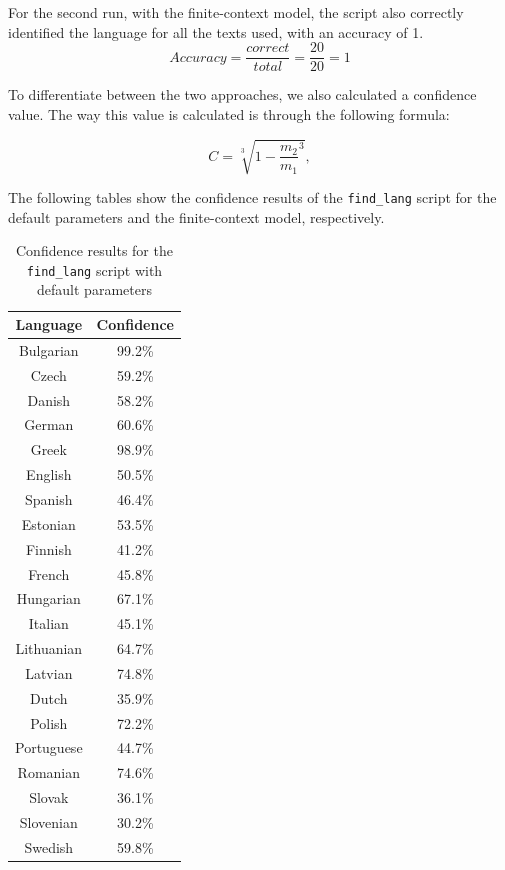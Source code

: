 \documentclass{article}
\begin{document}
For the second run, with the finite-context model, the script also correctly identified the language for all the texts used, with an accuracy of 1.
\begin{equation}
    \label{eq:find_lang_finite_context_accuracy}
    Accuracy = \frac{correct}{total} = \frac{20}{20} = 1
\end{equation}

To differentiate between the two approaches, we also calculated a confidence value. The way this value is calculated is through the following formula:

$$
C = \sqrt[3]{1 - \frac{m_2}{m_1}^3},
$$

The following tables show the confidence results of the \verb|find_lang| script for the default parameters and the finite-context model, respectively.

\begin{table}
    \centering
    \begin{tabular}{|c|c|}
        \hline
        Language & Confidence \\
        \hline
        Bulgarian & 99.2\% \\
        Czech & 59.2\% \\
        Danish & 58.2\% \\
        German & 60.6\% \\
        Greek & 98.9\% \\
        English & 50.5\% \\
        Spanish & 46.4\% \\
        Estonian & 53.5\% \\
        Finnish & 41.2\% \\
        French & 45.8\% \\
        Hungarian & 67.1\% \\
        Italian & 45.1\% \\
        Lithuanian & 64.7\% \\
        Latvian & 74.8\% \\
        Dutch & 35.9\% \\
        Polish & 72.2\% \\
        Portuguese & 44.7\% \\
        Romanian & 74.6\% \\
        Slovak & 36.1\% \\
        Slovenian & 30.2\% \\
        Swedish & 59.8\% \\
        \hline
    \end{tabular}
    \caption{Confidence results for the \texttt{find\_lang} script with default parameters}
    \label{tab:find_lang_default_confidence}
\end{table}
\end{document}

